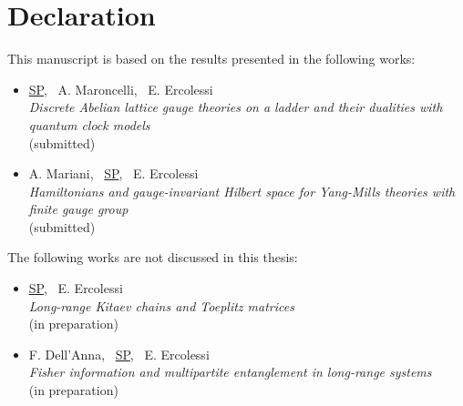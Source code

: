 \chapter*{Declaration}


This manuscript is based on the results presented in the following works:

\begin{itemize}
    \frenchspacing
    \item
        \underline{SP}, ~A. Maroncelli, ~E. Ercolessi\\
        \emph{Discrete Abelian lattice gauge theories on a ladder and their dualities with quantum clock models}\\
         (submitted)

    \item
        A. Mariani, ~\underline{SP}, ~E. Ercolessi\\
        \emph{Hamiltonians and gauge-invariant Hilbert space for Yang-Mills theories with finite gauge group }\\
         (submitted)
    \nonfrenchspacing
\end{itemize}

\vspace*{1cm}

\noindent The following works are not discussed in this thesis:

\begin{itemize}
    \frenchspacing
    \item
        \underline{SP}, ~E. Ercolessi\\
        \emph{Long-range Kitaev chains and Toeplitz matrices} \\
        (in preparation)

    \item
        F. Dell'Anna, ~\underline{SP}, ~E. Ercolessi\\
        \emph{Fisher information and multipartite entanglement in long-range systems}\\
        (in preparation)

    \nonfrenchspacing
\end{itemize}

\cleardoublepage
